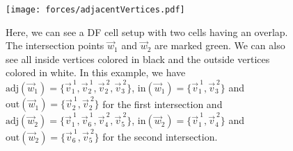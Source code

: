 \begin{figure}
	\begin{center}
		\texttt{[image: forces/adjacentVertices.pdf]}
		\caption{
			Here, we can see a DF cell setup with two cells having an overlap. 
			The intersection points $\vec{w}_1$ and $\vec{w}_2$ are marked green. 
			We can also see all inside vertices colored in black and the outside vertices colored in white.
			In this example, we have $\text{adj}(\vec{w}_1) = \{\vec{v}_1^{\:1}, \vec{v}_2^{\:1}, \vec{v}_2^{\:2}, \vec{v}_3^{\:2}\}$, $\text{in}(\vec{w}_1) = \{\vec{v}_1^{\:1}, \vec{v}_3^{\:2}\}$ and $\text{out}(\vec{w}_1) = \{\vec{v}_2^{\:1}, \vec{v}_2^{\:2}\}$ for the first intersection and $\text{adj}(\vec{w}_2) = \{\vec{v}_1^{\:1}, \vec{v}_6^{\:1}, \vec{v}_4^{\:2}, \vec{v}_5^{\:2}\}$, $\text{in}(\vec{w}_2) = \{\vec{v}_1^{\:1}, \vec{v}_4^{\:2}\}$ and $\text{out}(\vec{w}_2) = \{\vec{v}_6^{\:1}, \vec{v}_5^{\: 2}\}$ for the second intersection.
			}
		\label{fig:adjacent}
	\end{center}
\end{figure}


